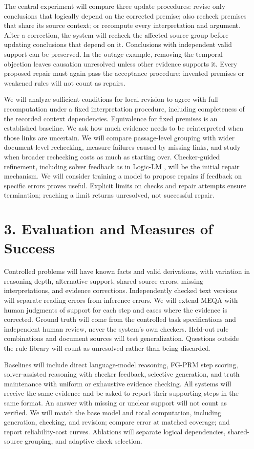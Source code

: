 \documentclass[12pt]{article}
\begin{document}
The central experiment will compare three update procedures: revise only conclusions that logically depend on the corrected premise; also recheck premises that share its source context; or recompute every interpretation and argument. After a correction, the system will recheck the affected source group before updating conclusions that depend on it. Conclusions with independent valid support can be preserved. In the outage example, removing the temporal objection leaves causation unresolved unless other evidence supports it. Every proposed repair must again pass the acceptance procedure; invented premises or weakened rules will not count as repairs.

We will analyze sufficient conditions for local revision to agree with full recomputation under a fixed interpretation procedure, including completeness of the recorded context dependencies. Equivalence for fixed premises is an established baseline. We ask how much evidence needs to be reinterpreted when those links are uncertain. We will compare passage-level grouping with wider document-level rechecking, measure failures caused by missing links, and study when broader rechecking costs as much as starting over. Checker-guided refinement, including solver feedback as in Logic-LM \citep{pan2023logiclm}, will be the initial repair mechanism. We will consider training a model to propose repairs if feedback on specific errors proves useful. Explicit limits on checks and repair attempts ensure termination; reaching a limit returns unresolved, not successful repair.

\section*{3. Evaluation and Measures of Success}

Controlled problems will have known facts and valid derivations, with variation in reasoning depth, alternative support, shared-source errors, missing interpretations, and evidence corrections. Independently checked text versions will separate reading errors from inference errors. We will extend MEQA with human judgments of support for each step and cases where the evidence is corrected. Ground truth will come from the controlled task specifications and independent human review, never the system's own checkers. Held-out rule combinations and document sources will test generalization. Questions outside the rule library will count as unresolved rather than being discarded.

Baselines will include direct language-model reasoning, FG-PRM step scoring, solver-assisted reasoning with checker feedback, selective generation, and truth maintenance with uniform or exhaustive evidence checking. All systems will receive the same evidence and be asked to report their supporting steps in the same format. An answer with missing or unclear support will not count as verified. We will match the base model and total computation, including generation, checking, and revision; compare error at matched coverage; and report reliability-cost curves. Ablations will separate logical dependencies, shared-source grouping, and adaptive check selection.
\end{document}

